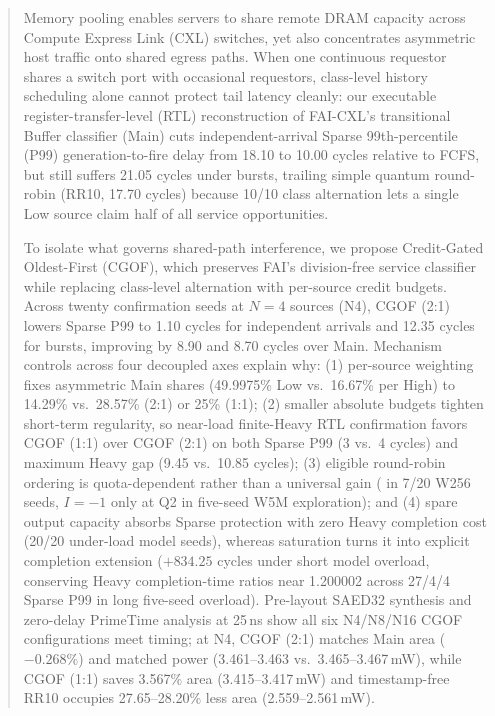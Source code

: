 \begin{abstract}
Memory pooling enables servers to share remote DRAM capacity across Compute Express Link (CXL) switches, yet also concentrates asymmetric host traffic onto shared egress paths. When one continuous requestor shares a switch port with occasional requestors, class-level history scheduling alone cannot protect tail latency cleanly: our executable register-transfer-level (RTL) reconstruction of FAI-CXL's transitional Buffer classifier (Main) cuts independent-arrival Sparse 99th-percentile (P99) generation-to-fire delay from 18.10 to 10.00 cycles relative to FCFS, but still suffers 21.05 cycles under bursts, trailing simple quantum round-robin (RR10, 17.70 cycles) because 10/10 class alternation lets a single Low source claim half of all service opportunities.

To isolate what governs shared-path interference, we propose Credit-Gated Oldest-First (CGOF), which preserves FAI's division-free service classifier while replacing class-level alternation with per-source credit budgets. Across twenty confirmation seeds at $N=4$ sources (N4), CGOF (2:1) lowers Sparse P99 to 1.10 cycles for independent arrivals and 12.35 cycles for bursts, improving by 8.90 and 8.70 cycles over Main. Mechanism controls across four decoupled axes explain why: (1) per-source weighting fixes asymmetric Main shares (49.9975\% Low vs.\ 16.67\% per High) to 14.29\% vs.\ 28.57\% (2:1) or 25\% (1:1); (2) smaller absolute budgets tighten short-term regularity, so near-load finite-Heavy RTL confirmation favors CGOF (1:1) over CGOF (2:1) on both Sparse P99 (3 vs.\ 4 cycles) and maximum Heavy gap (9.45 vs.\ 10.85 cycles); (3) eligible round-robin ordering is quota-dependent rather than a universal gain ( in 7/20 W256 seeds, $I=-1$ only at Q2 in five-seed W5M exploration); and (4) spare output capacity absorbs Sparse protection with zero Heavy completion cost (20/20 under-load model seeds), whereas saturation turns it into explicit completion extension ($+834.25$ cycles under short model overload, conserving Heavy completion-time ratios near 1.200002 across 27/4/4 Sparse P99 in long five-seed overload). Pre-layout SAED32 synthesis and zero-delay PrimeTime analysis at 25\,ns show all six N4/N8/N16 CGOF configurations meet timing; at N4, CGOF (2:1) matches Main area ($-0.268\%$) and matched power (3.461--3.463 vs.\ 3.465--3.467\,mW), while CGOF (1:1) saves 3.567\% area (3.415--3.417\,mW) and timestamp-free RR10 occupies 27.65--28.20\% less area (2.559--2.561\,mW).
\end{abstract}

